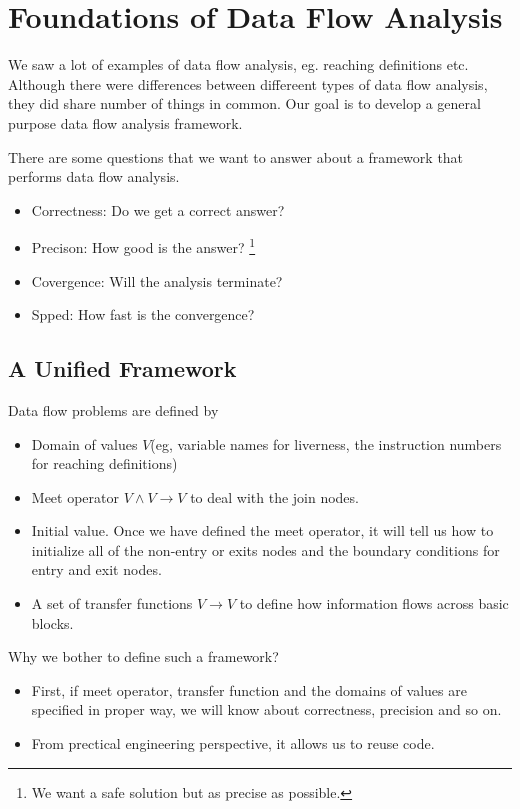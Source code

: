 \section{Foundations of Data Flow Analysis}



We saw a lot of examples of data flow analysis, eg. reaching definitions etc. Although 
there were differences between differeent types of data flow analysis, they did share number of 
things in common. Our goal is to develop a general purpose data flow analysis framework.


There are some questions that we want to answer about a framework that performs data 
flow analysis.

\begin{itemize}
\item Correctness: Do we get a correct answer? 
\item Precison: How good is the answer? \footnote{We want a safe solution but as precise as possible. }
\item Covergence: Will the analysis terminate? 
\item Spped: How fast is the convergence?
\end{itemize}



\subsection{A Unified Framework}

Data flow problems are defined by 
\begin{itemize}

\item Domain of values \( V \)(eg, variable names for liverness, the instruction numbers for reaching definitions)
\item Meet operator \( V \wedge V \rightarrow V \) to deal with the join nodes.
\item Initial value. Once we have defined the meet operator, it will tell us how to initialize 
all of the non-entry or exits nodes and the boundary conditions for entry and exit nodes. 
\item A set of transfer functions \( V  \rightarrow V \) to define how information flows across basic blocks. 
\end{itemize}   



Why we bother to define such a framework?
\begin{itemize}
\item First, if meet operator, transfer function and the domains of values are specified in proper way, we will know about 
correctness, precision and so on. 

\item From prectical engineering perspective, it allows us to reuse code.
\end{itemize}   


